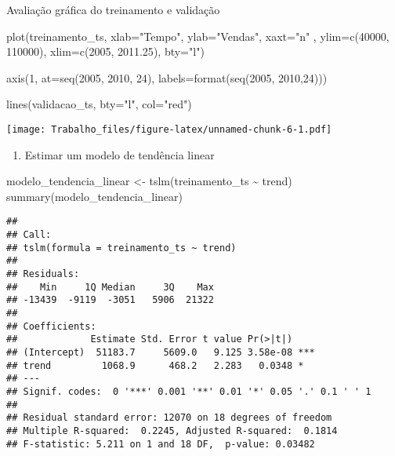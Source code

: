 \documentclass[
]{article}
\newenvironment{Shaded}{\begin{snugshade}}{\end{snugshade}}
\newcommand{\AttributeTok}[1]{\textcolor[rgb]{0.77,0.63,0.00}{#1}}
\newcommand{\DecValTok}[1]{\textcolor[rgb]{0.00,0.00,0.81}{#1}}
\newcommand{\FloatTok}[1]{\textcolor[rgb]{0.00,0.00,0.81}{#1}}
\newcommand{\FunctionTok}[1]{\textcolor[rgb]{0.00,0.00,0.00}{#1}}
\newcommand{\NormalTok}[1]{#1}
\newcommand{\OtherTok}[1]{\textcolor[rgb]{0.56,0.35,0.01}{#1}}
\newcommand{\SpecialCharTok}[1]{\textcolor[rgb]{0.00,0.00,0.00}{#1}}
\newcommand{\StringTok}[1]{\textcolor[rgb]{0.31,0.60,0.02}{#1}}
\providecommand{\tightlist}{%
  \setlength{\itemsep}{0pt}\setlength{\parskip}{0pt}}
\begin{document}
Avaliação gráfica do treinamento e validação

\begin{Shaded}
\begin{Highlighting}[]
\FunctionTok{plot}\NormalTok{(treinamento\_ts, }\AttributeTok{xlab=}\StringTok{"Tempo"}\NormalTok{, }\AttributeTok{ylab=}\StringTok{"Vendas"}\NormalTok{, }\AttributeTok{xaxt=}\StringTok{"n"}\NormalTok{ , }\AttributeTok{ylim=}\FunctionTok{c}\NormalTok{(}\DecValTok{40000}\NormalTok{, }\DecValTok{110000}\NormalTok{), }\AttributeTok{xlim=}\FunctionTok{c}\NormalTok{(}\DecValTok{2005}\NormalTok{, }\FloatTok{2011.25}\NormalTok{), }\AttributeTok{bty=}\StringTok{"l"}\NormalTok{)}

\FunctionTok{axis}\NormalTok{(}\DecValTok{1}\NormalTok{, }\AttributeTok{at=}\FunctionTok{seq}\NormalTok{(}\DecValTok{2005}\NormalTok{, }\DecValTok{2010}\NormalTok{, }\DecValTok{24}\NormalTok{), }\AttributeTok{labels=}\FunctionTok{format}\NormalTok{(}\FunctionTok{seq}\NormalTok{(}\DecValTok{2005}\NormalTok{, }\DecValTok{2010}\NormalTok{,}\DecValTok{24}\NormalTok{)))}

\FunctionTok{lines}\NormalTok{(validacao\_ts, }\AttributeTok{bty=}\StringTok{"l"}\NormalTok{, }\AttributeTok{col=}\StringTok{"red"}\NormalTok{)}
\end{Highlighting}
\end{Shaded}

\texttt{[image: Trabalho\_files/figure-latex/unnamed-chunk-6-1.pdf]}

\begin{enumerate}
\def\labelenumi{\arabic{enumi}.}
\setcounter{enumi}{4}
\tightlist
\item
  Estimar um modelo de tendência linear
\end{enumerate}

\begin{Shaded}
\begin{Highlighting}[]
\NormalTok{modelo\_tendencia\_linear }\OtherTok{\textless{}{-}} \FunctionTok{tslm}\NormalTok{(treinamento\_ts }\SpecialCharTok{\textasciitilde{}}\NormalTok{ trend)}
\FunctionTok{summary}\NormalTok{(modelo\_tendencia\_linear)}
\end{Highlighting}
\end{Shaded}

\begin{verbatim}
## 
## Call:
## tslm(formula = treinamento_ts ~ trend)
## 
## Residuals:
##    Min     1Q Median     3Q    Max 
## -13439  -9119  -3051   5906  21322 
## 
## Coefficients:
##             Estimate Std. Error t value Pr(>|t|)    
## (Intercept)  51183.7     5609.0   9.125 3.58e-08 ***
## trend         1068.9      468.2   2.283   0.0348 *  
## ---
## Signif. codes:  0 '***' 0.001 '**' 0.01 '*' 0.05 '.' 0.1 ' ' 1
## 
## Residual standard error: 12070 on 18 degrees of freedom
## Multiple R-squared:  0.2245, Adjusted R-squared:  0.1814 
## F-statistic: 5.211 on 1 and 18 DF,  p-value: 0.03482
\end{verbatim}
\end{document}
